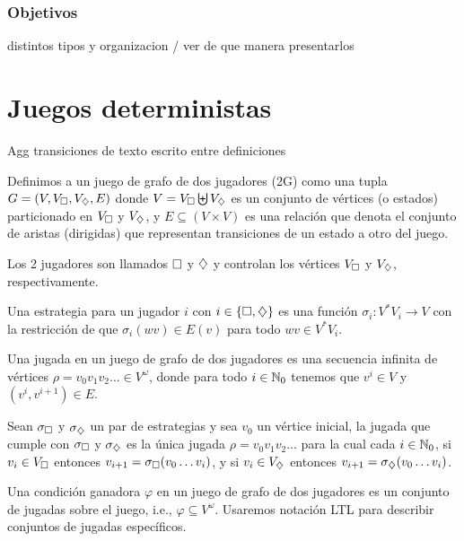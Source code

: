 \subsubsection{Objetivos}

distintos tipos y organizacion / ver de que manera presentarlos

\section{Juegos deterministas}

Agg transiciones de texto escrito entre definiciones

\begin{definition}
	Definimos a un juego de grafo de dos jugadores (2G) como una tupla $G = (V, V_\square,V_\diamondsuit, E)$ donde $V = V_\square \biguplus V_\diamondsuit$ es un conjunto de vértices (o estados) particionado en $V_\square$ y $V_\diamondsuit$, y $E \subseteq (V\times V)$ es una relación que denota el conjunto de aristas (dirigidas) que representan transiciones de un estado a otro del juego.

	Los 2 jugadores son llamados $\square$ y $\diamondsuit$ y controlan los vértices
	$V_\square$ y $V_\diamondsuit$, respectivamente.
\end{definition}

\begin{definition}
	Una estrategia para un jugador $i$ con $i \in \{\square, \diamondsuit\}$ es una función $\sigma_i: V^*V_i \rightarrow V$ con la restricción de que $\sigma_i(wv) \in E(v)$ para todo $wv \in V^*V_i$.
\end{definition}

\begin{definition}
	Una jugada en un juego de grafo de dos jugadores es una secuencia infinita de vértices $\rho = v_0v_1v_2 \dots \in V^\omega$, donde para todo $i \in \mathbb{N}_0$ tenemos que $v^i \in V$ y $(v^i, v^{i+1}) \in E$.

	Sean $\sigma_\square$ y $\sigma_\diamondsuit$ un par de estrategias y sea $v_0$ un
	vértice inicial, la jugada que cumple con $\sigma_\square$ y $\sigma_\diamondsuit$ es la
	única jugada $\rho = v_0 v_1 v_2 \dots$ para la cual cada $i \in \mathbb{N}_0$, si $v_i
		\in V_\square$ entonces $v_{i+1} = \sigma_\square(v_0 \dots v_i)$, y si $v_i \in
		V_\diamondsuit$ entonces $v_{i+1} = \sigma_\diamondsuit(v_0 \dots v_i)$.
\end{definition}

\begin{definition}
	Una condición ganadora $\varphi$ en un juego de grafo de dos jugadores es un conjunto de jugadas sobre el juego, i.e., $\varphi \subseteq V^\omega$. Usaremos notación LTL para describir conjuntos de jugadas específicos.
\end{definition}

